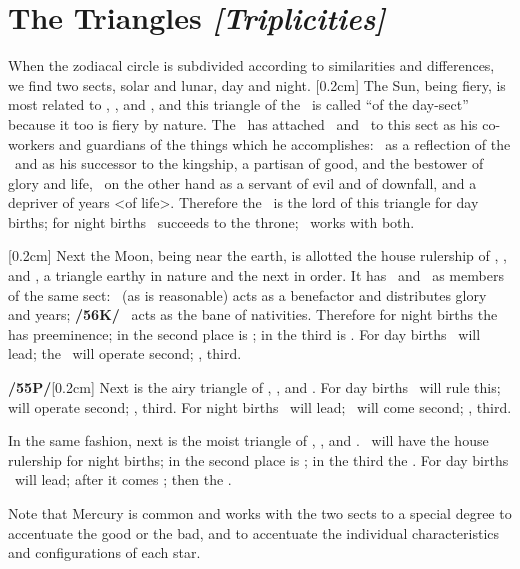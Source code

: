 \section{The Triangles \textit{[Triplicities]}}

When the zodiacal circle is subdivided according to similarities and differences, we find two sects, solar and lunar, day and night. 
[0.2cm]
The Sun, being fiery, is most related to \Aries, \Leo, and \Sagittarius, and this triangle of the \Sun\, is called “of the day-sect” because it too is fiery by nature. The \Sun\, has attached \Jupiter\, and \Saturn\, to this sect as his co-workers and guardians of the things which he accomplishes: \Jupiter\, as a reflection of the \Sun\, and as his successor to the kingship, a partisan of good, and the bestower of glory
and life, \Saturn\, on the other hand as a servant of evil and of downfall, and a depriver of years <of life>. Therefore the \Sun\, is the lord of this triangle for day births; for night births \Jupiter\, succeeds to the throne; \Saturn\, works with both.

[0.2cm]
Next the Moon, being near the earth, is allotted the house rulership of \Taurus, \Virgo, and \Capricorn, a triangle earthy in nature and the next in order. It has \Venus\, and \Mars\, as members of the same sect: \Venus\,
(as is reasonable) acts as a benefactor and distributes glory and years; \textbf{/56K/} \Mars\, acts as the bane of
nativities. Therefore for night births the \Moon\, has preeminence; in the second place is \Venus; in the third
is \Mars. For day births \Venus\, will lead; the \Moon\, will operate second; \Mars, third.

\textbf{/55P/}[0.2cm] Next is the airy triangle of \Gemini, \Libra, and \Aquarius. For day births \Saturn\, will rule this;
\Mercury\, will operate second; \Jupiter, third. For night births \Mercury\, will lead; \Saturn\, will come second; \Jupiter, third.

In the same fashion, next is the moist triangle of \Cancer, \Scorpio, and \Pisces. \Mars\, will have the house rulership for night births; in the second place is \Venus; in the third the \Moon. For day births \Venus\, will lead; after it comes \Mars; then the \Moon. 

\mndl[0.2cm]
Note that Mercury is common and works with the two sects to a special degree to accentuate the good or the bad, and to accentuate the individual characteristics and configurations of each star.

\newpage